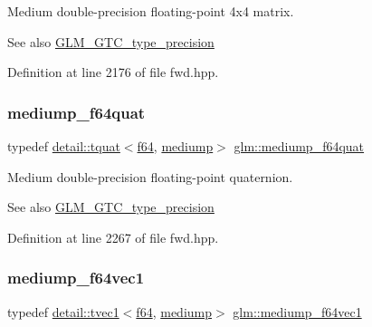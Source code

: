 Medium double-\/precision floating-\/point 4x4 matrix. \begin{DoxySeeAlso}{See also}
\hyperlink{group__gtc__type__precision}{G\+L\+M\+\_\+\+G\+T\+C\+\_\+type\+\_\+precision} 
\end{DoxySeeAlso}


Definition at line 2176 of file fwd.\+hpp.

\mbox{\label{group__gtc__type__precision_ga7cf626acf7f4fc29355c147bfe05163d}} 
\subsubsection{\texorpdfstring{mediump\+\_\+f64quat}{mediump\_f64quat}}
{\footnotesize\ttfamily typedef \hyperlink{structglm_1_1detail_1_1tquat}{detail\+::tquat}$<$\hyperlink{group__gtc__type__precision_ga2bba392e555124b36cde6abba349bab3}{f64}, \hyperlink{namespaceglm_a0f04f086094c747d227af4425893f545a6416f3ea0c9025fb21ed50c4d6620482}{mediump}$>$ \hyperlink{group__gtc__type__precision_ga7cf626acf7f4fc29355c147bfe05163d}{glm\+::mediump\+\_\+f64quat}}

Medium double-\/precision floating-\/point quaternion. \begin{DoxySeeAlso}{See also}
\hyperlink{group__gtc__type__precision}{G\+L\+M\+\_\+\+G\+T\+C\+\_\+type\+\_\+precision} 
\end{DoxySeeAlso}


Definition at line 2267 of file fwd.\+hpp.

\mbox{\label{group__gtc__type__precision_ga1e3bbbd9ce5e215c4ba0980264b2711d}} 
\subsubsection{\texorpdfstring{mediump\+\_\+f64vec1}{mediump\_f64vec1}}
{\footnotesize\ttfamily typedef \hyperlink{structglm_1_1detail_1_1tvec1}{detail\+::tvec1}$<$\hyperlink{group__gtc__type__precision_ga2bba392e555124b36cde6abba349bab3}{f64}, \hyperlink{namespaceglm_a0f04f086094c747d227af4425893f545a6416f3ea0c9025fb21ed50c4d6620482}{mediump}$>$ \hyperlink{group__gtc__type__precision_ga1e3bbbd9ce5e215c4ba0980264b2711d}{glm\+::mediump\+\_\+f64vec1}}

